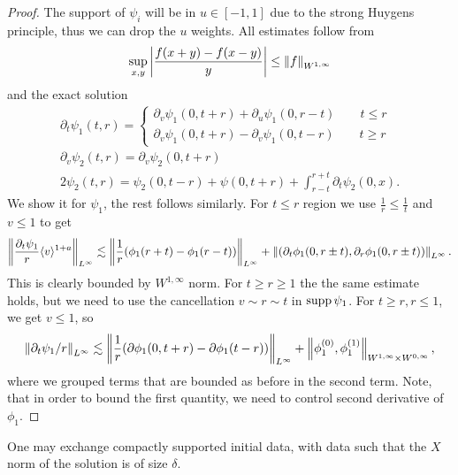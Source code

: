 \documentclass[11pt, oneside]{amsart}
\begin{document}
	\begin{proof}
		The support of $\psi_i$ will be in $u\in[-1,1]$ due to the strong Huygens principle, thus we can drop the $u$ weights. All estimates follow from 
		\begin{equation*}
			\begin{gathered}
				\sup_{x,y} \left\lvert \frac{f(x+y)-f(x-y)}{y}\right\rvert\leq \left\lVert f\right\rVert_{W^{1,\infty}}
			\end{gathered}
		\end{equation*}
		and the exact solution
		\begin{equation*}
			\begin{gathered}
				\partial_t\psi_1(t,r)=\begin{cases}
					\partial_v\psi_1(0,t+r)+\partial_u\psi_1(0,r-t)\qquad t\leq r\\
					\partial_v\psi_1(0,t+r)-\partial_v\psi_1(0,t-r)\qquad t\geq r
				\end{cases}\\
			 \partial_v\psi_2(t,r)=\partial_v\psi_2(0,t+r)\\
			 2\psi_2(t,r)=\psi_2(0,t-r)+\psi(0,t+r)+\int_{r-t}^{r+t}\partial_t\psi_2(0,x).
			\end{gathered}
		\end{equation*}
	We show it for $\psi_1$, the rest follows similarly. For $t\leq r$ region we use $\frac{1}{r}\leq\frac{1}{t}$ and $v\leq1$ to get 
	\begin{equation*}
		\begin{gathered}
			\left\lVert \frac{\partial_t\psi_1}{r}\langle v \rangle^{1+a}\right\rVert_{L^\infty}\lesssim \left\lVert \frac{1}{r}(\phi_1(r+t)-\phi_1(r-t))\right\rVert_{L^\infty}+\left\lVert (\partial_t\phi_1(0,r\pm t),\partial_r\phi_1(0,r\pm t))\right\rVert_{L^\infty}.
		\end{gathered}
	\end{equation*}
	This is clearly bounded by $W^{1,\infty}$ norm. For $t\geq r\geq1$ the the same estimate holds, but we need to use the cancellation $v\sim r\sim t$ in $\operatorname{supp}\psi_1$. For $t\geq r,r\leq1$, we get $v\leq1$, so
	\begin{equation*}
		\begin{gathered}
			\left\lVert \partial_t\psi_1/r\right\rVert_{L^\infty}\lesssim \left\lVert \frac{1}{r}(\partial\phi_1(0,t+r)-\partial\phi_1(t-r))\right\rVert_{L^\infty}+\left\lVert \phi_1^{(0)},\phi_1^{(1)}\right\rVert_{W^{1,\infty}\times W^{0,\infty}},
		\end{gathered}
	\end{equation*}
	where we grouped terms that are bounded as before in the second term. Note, that in order to bound the first quantity, we need to control second derivative of $\phi_1$. 
	\end{proof}
	\begin{remark}
		One may exchange compactly supported initial data, with data such that the $X$ norm of the solution is of size $\delta$.
	\end{remark}
	
\end{document}
